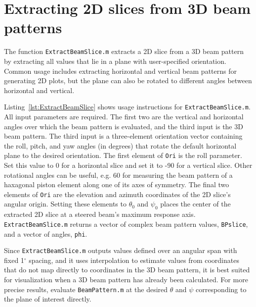 

\section{Extracting 2D slices from 3D beam patterns}

The function \texttt{ExtractBeamSlice.m} extracts a 2D slice from a 3D beam pattern by extracting all values that lie in a plane with user-specified orientation. Common usage includes extracting horizontal and vertical beam patterns for generating 2D plots, but the plane can also be rotated to different angles between horizontal and vertical. 

Listing~\ref{lst:ExtractBeamSlice} shows usage instructions for \texttt{ExtractBeamSlice.m}. All input parameters are required. The first two are the vertical and horizontal angles over which the beam pattern is evaluated, and the third input is the 3D beam pattern. The third input is a three-element orientation vector containing the roll, pitch, and yaw angles (in degrees) that rotate the default horizontal plane to the desired orientation. The first element of \texttt{Ori} is the roll parameter. Set this value to 0 for a horizontal slice and set it to -90 for a vertical slice. Other rotational angles can be useful, e.g. 60 for measuring the beam pattern of a haxagonal piston element along one of its axes of symmetry. The final two elements of \texttt{Ori} are the elevation and azimuth coordinates of the 2D slice's angular origin. Setting these elements to $\theta_0$ and $\psi_0$ places the center of the extracted 2D slice at a steered beam's maximum response axis. \texttt{ExtractBeamSlice.m} returns a vector of complex beam pattern values, \texttt{BPslice},  and a vector of angles, \texttt{phi}.



Since \texttt{ExtractBeamSlice.m} outputs values defined over an angular span with fixed 1$^\circ$ spacing, and it uses interpolation to estimate values from coordinates that do not map directly to coordinates in the 3D beam pattern, it is best suited for visualization when a 3D beam pattern has already been calculated. For more precise results, evaluate \texttt{BeamPattern.m} at the desired $\theta$ and $\psi$ corresponding to the plane of interest directly. 

